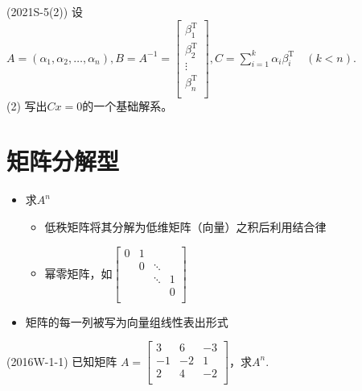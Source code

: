 \documentclass[lang=cn,newtx,10pt,scheme=chinese]{elegantbook}
\begin{document}
\begin{exercise}
    (2021S-5(2)) 设$A = (\alpha_1,\alpha_2,\dots,\alpha_n),B = A^{-1} = 
    \left[
    \begin{matrix}
        \beta_1^\mathrm{T} \\
        \beta_2^\mathrm{T} \\
        \vdots \\
        \beta_n^\mathrm{T} \\
    \end{matrix}
    \right]
    , C = \sum_{i=1}^k \alpha_i \beta_i^\mathrm{T} \quad (k<n)
    $. \\
    (2) 写出$Cx = 0$的一个基础解系。
\end{exercise}

\section{矩阵分解型}

\begin{itemize}
    \item 求$A^n$
    \begin{itemize}
        \item 低秩矩阵将其分解为低维矩阵（向量）之积后利用结合律
        \item 幂零矩阵，如$
        \left[
        \begin{matrix}
            0 & 1 &         & \\
              & 0 & \ddots &  \\
              &   & \ddots & 1  \\
              &   &         & 0 \\
        \end{matrix}
        \right]
        $
    \end{itemize}
    \item 矩阵的每一列被写为向量组线性表出形式
\end{itemize}

\begin{example}
    (2016W-1-1) 已知矩阵
    $
    A = 
    \left[
    \begin{matrix}
        3 & 6 & -3 \\
        -1 & -2 & 1 \\
        2 & 4 & -2  \\
    \end{matrix}
    \right]
    $，求$A^n$.
\end{example}
\end{document}
